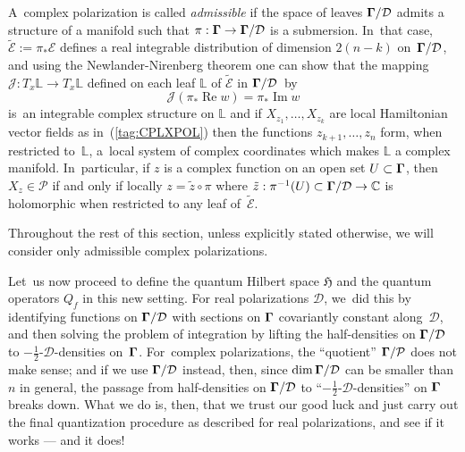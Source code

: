 \documentclass[12pt]{amsart}
\numberwithin{equation}{section}
\theoremstyle{remark}
\let\Bbb\mathbb \let\Cal\mathcal \let\frak\mathfrak
\newcommand\Omg{{\bigam}}   %
\newcommand\PP{{\Cal P}}
\newcommand\DD{{\Cal D}}
\newcommand\MD{{\Omg/\DD}}
\newcommand\mhD{$-\tfrac12$-$\DD$}
\newcommand\EE{{\Cal E}}
\newcommand\HH{\mathfrak H}
\newcommand{\CC}{\C}
\newcommand{\bigam}{\mbox{\boldmath $\Gamma$}}
\newcommand{\C}{\mathbb C}
\begin{document}
A~complex polarization is called {\it admissible\/} if the space of leaves
$\MD$ admits a structure of a manifold such that $\pi:\Omg\to\MD$ is a
submersion. In~that case, $\tilde\EE:=\pi_*\EE$ defines a real integrable
distribution of dimension $2(n-k)$ on~$\MD$, and using the Newlander-Nirenberg
theorem one can show that the mapping $\Cal J: T_x\Bbb L\to T_x\Bbb L$ defined
on each leaf $\Bbb L$ of $\tilde\EE$ in $\MD$~by
$$ \Cal J(\pi_*\operatorname{Re}w) = \pi_*\operatorname{Im}w  $$
is~an integrable complex structure on $\Bbb L$ and if $X_{z_1},\dots,X_{z_k}$
are local Hamiltonian vector fields as in~(\ref{tag:CPLXPOL}) then the
functions $z_{k+1},\dots,z_n$ form, when restricted to~$\Bbb L$, a~local system
of complex coordinates which makes $\Bbb L$ a complex manifold. In~particular,
if $z$ is a complex function on an open set $U\subset \Omg$, then $X_z\in\PP$
if and only if locally $z=\tilde z\circ\pi$ where $\tilde z:\pi^{-1}(U)\subset
\MD\to\CC$ is holomorphic when restricted to any leaf of~$\tilde\EE$.

Throughout the rest of this section, unless explicitly stated otherwise, we
will consider only admissible complex polarizations.

Let~us now proceed to define the quantum Hilbert space $\HH$ and the quantum
operators $Q_f$ in this new setting. For real polarizations $\DD$, we~did this
by identifying functions on $\MD$ with sections on $\Omg$ covariantly constant
along~$\DD$, and then solving the problem of integration by lifting the
half-densities on $\MD$ to \mhD-densities on~$\Omg$. For~complex polarizations,
the ``quotient'' $\Omg/\PP$ does not make sense; and if we use $\MD$ instead,
then, since $\dim\MD$ can be smaller than $n$ in general, the passage from
half-densities on $\MD$ to ``\mhD-densities'' on $\Omg$ breaks down.
What we do is, then, that we trust our good luck and
just carry out the final quantization procedure as described for real
polarizations, and see if it works --- and it does!
\end{document}
